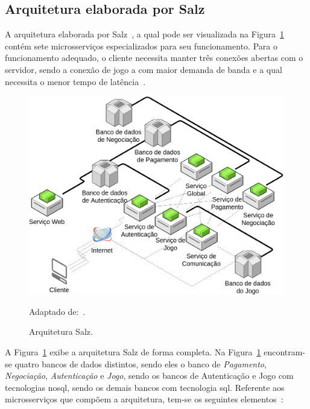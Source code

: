 \subsection{Arquitetura elaborada por Salz}
\label{salz}

A arquitetura elaborada por Salz~\cite{albion_online_unite}, a qual pode ser visualizada na Figura~\ref{full_salz} contém sete microsserviços especializados para seu funcionamento.
%
Para o funcionamento adequado, o cliente necessita manter três conexões abertas com o servidor, sendo a conexão de jogo a com maior demanda de banda e a qual necessita o menor tempo de latência~\cite{albion_online_unite}.

\begin{figure}[htb!]
  \caption{Arquitetura Salz.}
  \label{full_salz}
  \includegraphics[width=\textwidth]{arquiteturas/full_salz.png}
  \centering

  Adaptado de:~\cite{albion_online_unite}.
\end{figure}



A Figura~\ref{full_salz} exibe a arquitetura Salz de forma completa.
%
Na Figura~\ref{full_salz} encontram-se quatro bancos de dados distintos, sendo eles o banco de \textit{Pagamento}, \textit{Negociação}, \textit{Autenticação} e \textit{Jogo}, sendo os bancos de Autenticação e Jogo com tecnologias \ac{nosql}, sendo os demais bancos com tecnologia \ac{sql}.
%
Referente aos microsserviços que compõem a arquitetura, tem-se os seguintes elementos~\cite{salz_albion}:



